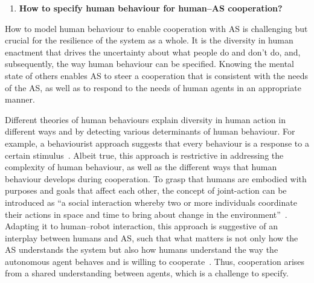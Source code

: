 \documentclass[sigconf,nonacm]{acmart}%
\begin{document}
	\begin{enumerate}[leftmargin=0.5cm]

		\item \textbf{How to specify human behaviour for human--AS cooperation?}
	\end{enumerate}
	How to model human behaviour to enable cooperation with AS is challenging but crucial for the resilience of the system as a whole. It is the diversity in human enactment that drives the uncertainty about what people do and don't do, and, subsequently, the way human behaviour can be specified. Knowing the mental state of others enables AS to steer a cooperation that is consistent with the needs of the AS, as well as to respond to the needs of human agents in an appropriate manner. 
	
	Different theories of human behaviours explain diversity in human action in different ways and by detecting various determinants of human behaviour. For example, a behaviourist approach suggests that every behaviour is a response to a certain stimulus~\cite{heimlich2008understanding}. Albeit true, this approach is restrictive in addressing the complexity of human behaviour, as well as the different ways that human behaviour develops during cooperation. To grasp that humans are embodied with purposes and goals that affect each other, the concept of joint-action can be introduced as ``a social interaction whereby two or more individuals coordinate their actions in space and time to bring about change in the environment''~\cite{sebanz2006joint}. Adapting it to human–robot interaction, this approach is suggestive of an interplay between humans and AS, such that what matters is not only how the AS understands the system but also how humans understand the way the autonomous agent behaves and is willing to cooperate~\cite{grigore:2013}. Thus, cooperation arises from a shared understanding between agents, which is a challenge to specify. 
	
\end{document}
